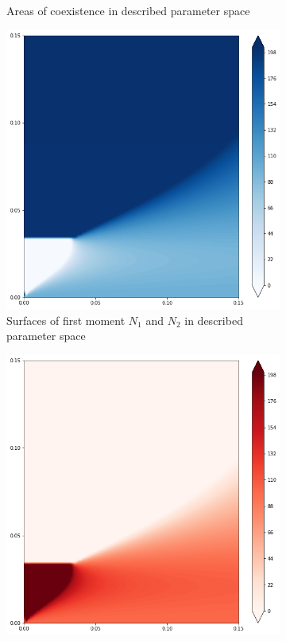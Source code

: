 \begin{figure}[ht]
\begin{subfigure}{.5\textwidth}
		\caption{Areas of coexistence in described parameter space}
		\label{fig:hmd3:sub2}
	\end{subfigure}
	\begin{subfigure}{.5\textwidth}
	\centering
	\includegraphics[width=.93\linewidth]{hm_d3_n1.png}
	\caption{Surfaces of first moment \(N_1\) and \(N_2\) in described parameter space}
	\label{fig:hmd3:sub3}
\end{subfigure}%
\begin{subfigure}{.5\textwidth}
	\centering
	\includegraphics[width=.93\linewidth]{hm_d3_n2.png}

\end{subfigure}
\end{figure}
